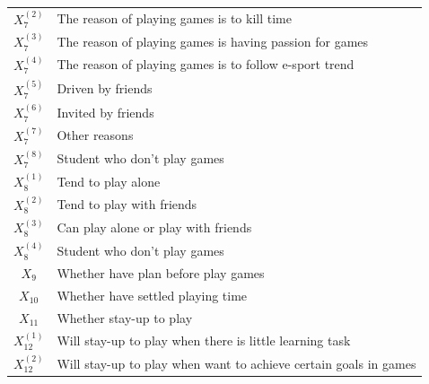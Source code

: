 \documentclass[scheme=plain]{ctexart}
\begin{document}
\begin{table}[H]
\begin{tabularx}{.8\textwidth}{cX}
                \rowcolor[HTML]{EFEFEF} $X_{7}^{(2)}$  & The reason of playing games is to kill time                      \\
                                        $X_{7}^{(3)}$  & The reason of playing games is having passion for games          \\
                \rowcolor[HTML]{EFEFEF} $X_{7}^{(4)}$  & The reason of playing games is to follow e-sport trend           \\
                                        $X_{7}^{(5)}$  & Driven by friends                                                \\
                \rowcolor[HTML]{EFEFEF} $X_{7}^{(6)}$  & Invited by friends                                               \\
                                        $X_{7}^{(7)}$  & Other reasons                                                    \\
                \rowcolor[HTML]{EFEFEF} $X_{7}^{(8)}$  & Student who don't play games                                     \\
                                        $X_{8}^{(1)}$  & Tend to play alone                                               \\
                \rowcolor[HTML]{EFEFEF} $X_{8}^{(2)}$  & Tend to play with friends                                        \\
                                        $X_{8}^{(3)}$  & Can play alone or play with friends                              \\
                \rowcolor[HTML]{EFEFEF} $X_{8}^{(4)}$  & Student who don't play games                                     \\
                                        $X_{9}$        & Whether have plan before play games                              \\
                \rowcolor[HTML]{EFEFEF} $X_{10}$       & Whether have settled playing time                                \\
                                        $X_{11}$       & Whether stay-up to play                                          \\
                \rowcolor[HTML]{EFEFEF} $X_{12}^{(1)}$ & Will stay-up to play when there is little learning task          \\
                                        $X_{12}^{(2)}$ & Will stay-up to play when want to achieve certain goals in games \\

\end{tabularx}
\end{table}
\end{document}
